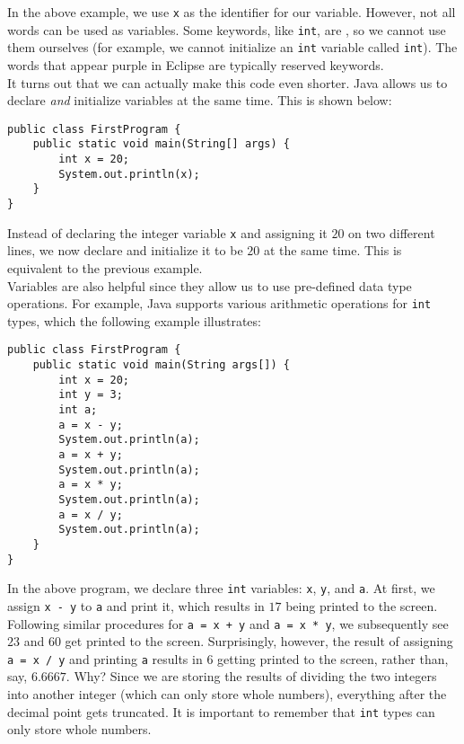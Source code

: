 In the above example, we use \verb!x! as the identifier for our variable. However, not all words can be used as variables. Some keywords, like \verb!int!, are , so we cannot use them ourselves (for example, we cannot initialize an \verb!int! variable called \verb!int!). The words that appear purple in Eclipse are typically reserved keywords. \\

It turns out that we can actually make this code even shorter. Java allows us to declare \textit{and} initialize variables at the same time. This is shown below:

\begin{lstlisting}
public class FirstProgram {
    public static void main(String[] args) {
        int x = 20;
        System.out.println(x);
    }
}
\end{lstlisting}

Instead of declaring the integer variable \verb!x! and assigning it $20$ on two different lines, we now declare and initialize it to be $20$ at the same time. This is equivalent to the previous example. \\

Variables are also helpful since they allow us to use pre-defined data type operations. For example, Java supports various arithmetic operations for \verb!int! types, which the following example illustrates:

\begin{lstlisting}
public class FirstProgram {
    public static void main(String args[]) {
        int x = 20;
        int y = 3;
        int a;
        a = x - y;
        System.out.println(a);
        a = x + y;
        System.out.println(a);
        a = x * y;
        System.out.println(a);
        a = x / y;
        System.out.println(a);
    }
}
\end{lstlisting}

In the above program, we declare three \verb!int! variables: \verb!x!, \verb!y!, and \verb!a!. At first, we assign \verb!x - y! to \verb!a! and print it, which results in $17$ being printed to the screen. Following similar procedures for \verb!a = x + y! and \verb!a = x * y!, we subsequently see $23$ and $60$ get printed to the screen. Surprisingly, however, the result of assigning \verb!a = x / y! and printing \verb!a! results in $6$ getting printed to the screen, rather than, say, $6.6667$. Why? Since we are storing the results of dividing the two integers into another integer (which can only store whole numbers), everything after the decimal point gets truncated. It is important to remember that \verb!int! types can only store whole numbers. \\

